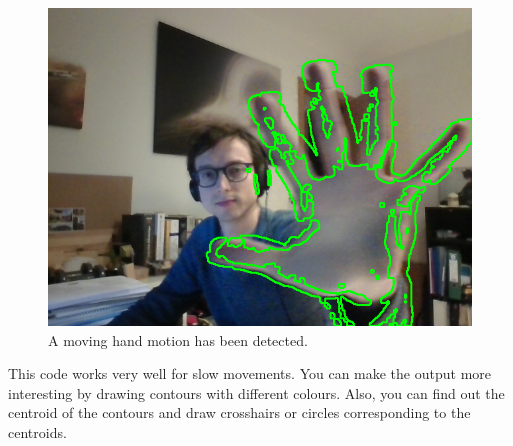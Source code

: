 \documentclass{labo}
\begin{document}
\begin{figure}[ht!]
\centering
\includegraphics[width=.7\textwidth]{motion-contour.png}
\caption{A moving hand motion has been detected.}
\label{fig:motion-contour}
\end{figure}
This code works very well for slow movements. You can make the output more interesting by drawing contours with different colours. Also, you can find out the centroid of the contours and draw crosshairs or circles corresponding to the centroids.






\end{document}
